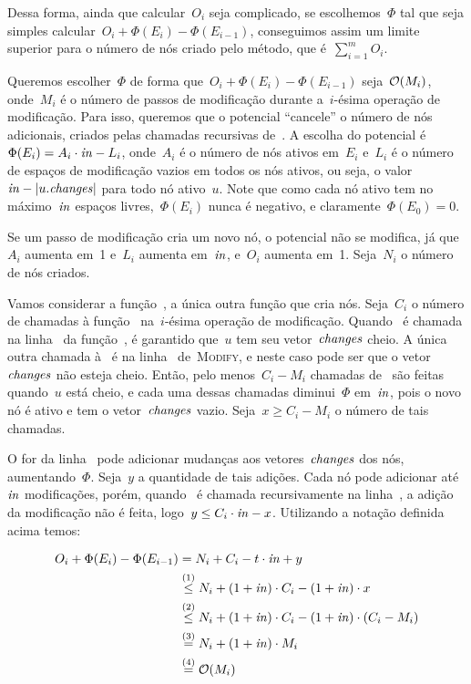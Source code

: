 \documentclass[../../main.tex]{subfiles}
\begin{document}
Dessa forma, ainda que calcular~$O_i$ seja complicado, se escolhemos~$\Phi$ tal que seja simples calcular~${O_i + \Phi(E_i) - \Phi(E_{i-1})}$, conseguimos assim um limite superior para o número de nós criado pelo método, que é~$\sum\limits_{i=1}^m{O_i}$.

Queremos escolher~$\Phi$ de forma que~${O_i + \Phi(E_i) - \Phi(E_{i-1})}$ seja~$\mathcal{O}(M_i)$, onde~$M_i$ é o número de passos de modificação durante a~$i$-ésima operação de modificação. Para isso, queremos que o potencial ``cancele'' o número de nós adicionais, criados pelas chamadas recursivas de~\textsc{}. A escolha do potencial é~$\Phi(E_i) = A_i \cdot \mathit{in} - L_i$, onde~$A_i$ é o número de nós ativos em~$E_i$ e~$L_i$ é o número de espaços de modificação vazios em todos os nós ativos, ou seja, o valor~$\mathit{in} - |u.\mathit{changes}|$ para todo nó ativo~$u$. Note que como cada nó ativo tem no máximo~$\mathit{in}$ espaços livres,~$\Phi(E_i)$ nunca é negativo, e claramente~$\Phi(E_0) = 0$.

Se um passo de modificação cria um novo nó, o potencial não se modifica, já que~$A_i$ aumenta em~1 e~$L_i$ aumenta em~$\mathit{in}$, e~$O_i$ aumenta em~1. Seja~$N_i$ o número de nós criados.

Vamos considerar a função~, a única outra função que cria nós. Seja~$C_i$ o número de chamadas à função~\textsc{} na~$i$-ésima operação de modificação. Quando~\textsc{} é chamada na linha~ da função~\textsc{}, é garantido que~$u$ tem seu vetor~$\mathit{changes}$ cheio. A única outra chamada à~\textsc{} é na linha~ de~\textsc{Modify}, e neste caso pode ser que o vetor~$\mathit{changes}$ não esteja cheio. Então, pelo menos~$C_i - M_i$ chamadas de~\textsc{} são feitas quando~$u$ está cheio, e cada uma dessas chamadas diminui~$\Phi$ em~$\mathit{in}$, pois o novo nó é ativo e tem o vetor~$\mathit{changes}$ vazio. Seja~$x \geq C_i - M_i$ o número de tais chamadas.

O for da linha~ pode adicionar mudanças aos vetores~$\mathit{changes}$ dos nós, aumentando~$\Phi$. Seja~$y$ a quantidade de tais adições. Cada nó pode adicionar até~$\mathit{in}$ modificações, porém, quando~\textsc{} é chamada recursivamente na linha~, a adição da modificação não é feita, logo~$y \leq C_i \cdot \mathit{in} - x$. Utilizando a notação definida acima temos:

\begin{align*}
	O_i + \Phi(E_i) - \Phi(E_{i-1}) & = N_i + C_i - t \cdot \mathit{in} + y
	\\ &\stackrel{\text{(1)}}{\leq} N_i + (1 + \mathit{in})\cdot C_i - (1 + \mathit{in}) \cdot x
	\\ &\stackrel{\text{(2)}}{\leq} N_i + (1 + \mathit{in})\cdot C_i - (1 + \mathit{in}) \cdot (C_i - M_i)
	\\ &\stackrel{\text{(3)}}{=} N_i + (1 + \mathit{in}) \cdot M_i
	\\ &\stackrel{\text{(4)}}{=} \mathcal{O}(M_i)
\end{align*}
\end{document}
